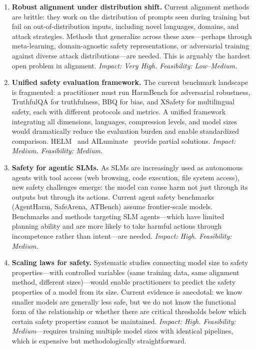 \documentclass[12pt,a4paper]{article}
\begin{document}
\begin{enumerate}[leftmargin=*]
    \item \textbf{Robust alignment under distribution shift.} Current alignment methods are brittle: they work on the distribution of prompts seen during training but fail on out-of-distribution inputs, including novel languages, domains, and attack strategies. Methods that generalize across these axes---perhaps through meta-learning, domain-agnostic safety representations, or adversarial training against diverse attack distributions---are needed. This is arguably the hardest open problem in alignment. \emph{Impact: Very High. Feasibility: Low--Medium.}

    \item \textbf{Unified safety evaluation framework.} The current benchmark landscape is fragmented: a practitioner must run HarmBench for adversarial robustness, TruthfulQA for truthfulness, BBQ for bias, and XSafety for multilingual safety, each with different protocols and metrics. A unified framework integrating all dimensions, languages, compression levels, and model sizes would dramatically reduce the evaluation burden and enable standardized comparison. HELM~\citep{liang2022helm} and AILuminate~\citep{ailuminate2025} provide partial solutions. \emph{Impact: Medium. Feasibility: Medium.}

    \item \textbf{Safety for agentic SLMs.} As SLMs are increasingly used as autonomous agents with tool access (web browsing, code execution, file system access), new safety challenges emerge: the model can cause harm not just through its outputs but through its actions. Current agent safety benchmarks (AgentHarm, SafeArena, ATBench) assume frontier-scale models. Benchmarks and methods targeting SLM agents---which have limited planning ability and are more likely to take harmful actions through incompetence rather than intent---are needed. \emph{Impact: High. Feasibility: Medium.}

    \item \textbf{Scaling laws for safety.} Systematic studies connecting model size to safety properties---with controlled variables (same training data, same alignment method, different sizes)---would enable practitioners to predict the safety properties of a model from its size. Current evidence is anecdotal: we know smaller models are generally less safe, but we do not know the functional form of the relationship or whether there are critical thresholds below which certain safety properties cannot be maintained. \emph{Impact: High. Feasibility: Medium}---requires training multiple model sizes with identical pipelines, which is expensive but methodologically straightforward.
\end{enumerate}
\end{document}
